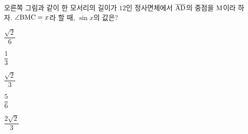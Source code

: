 \noindent\begin{minipage}[t]{0.58\linewidth}\vspace{0pt}\raggedright 오른쪽 그림과 같이 한 모서리의 길이가 $12$인 정사면체에서 $\overline{\mathrm{AD}}$의 중점을 $\mathrm{M}$이라 하자. $\angle\mathrm{BMC}=x$라 할 때, $\sin x$의 값은?\end{minipage}\hfill\begin{minipage}[t]{0.4\linewidth}\vspace{0pt}\centering \resizebox{\ifdim\width>\linewidth\linewidth\else\width\fi}{!}{}\end{minipage}\par
\begin{choicesii}{\rule[-3ex]{0pt}{8ex}$\dfrac{\sqrt{2}}{6}$}{\rule[-3ex]{0pt}{8ex}$\dfrac{1}{3}$}{\rule[-3ex]{0pt}{8ex}$\dfrac{\sqrt{2}}{3}$}{\rule[-3ex]{0pt}{8ex}$\dfrac{5}{6}$}{\rule[-3ex]{0pt}{8ex}$\dfrac{2\sqrt{2}}{3}$}\end{choicesii}
